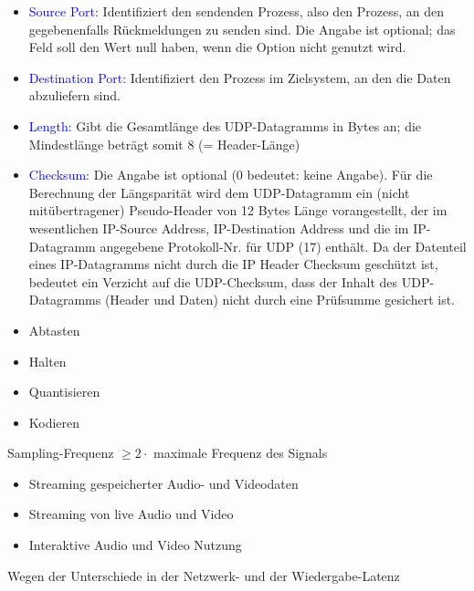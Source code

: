 \begin{itemize}
    \item \textcolor{blue}{Source Port:} Identifiziert den sendenden Prozess, also den Prozess, an den gegebenenfalls Rückmeldungen zu senden sind. Die Angabe ist optional; das Feld soll den Wert null haben, wenn die Option nicht genutzt wird.
    \item \textcolor{blue}{Destination Port:} Identifiziert den Prozess im Zielsystem, an den die Daten abzuliefern sind.
    \item \textcolor{blue}{Length:} Gibt die Gesamtlänge des UDP-Datagramms in Bytes an;
    die Mindestlänge beträgt somit 8 (= Header-Länge)
    \item \textcolor{blue}{Checksum:} Die Angabe ist optional (0 bedeutet: keine Angabe).
    Für die Berechnung der Längsparität wird dem UDP-Datagramm ein (nicht mitübertragener) Pseudo-Header von 12 Bytes Länge vorangestellt, der im wesentlichen IP-Source Address, IP-Destination Address und die im IP-Datagramm angegebene Protokoll-Nr. für UDP (17) enthält. Da der Datenteil eines IP-Datagramms nicht durch die IP Header Checksum geschützt ist, bedeutet ein Verzicht auf die UDP-Checksum, dass der Inhalt des UDP-Datagramms (Header und Daten) nicht durch eine Prüfsumme gesichert ist.
\end{itemize}

\begin{itemize}
    \item Abtasten
    \item Halten
    \item Quantisieren
    \item Kodieren
\end{itemize}

Sampling-Frequenz $\ge 2 \cdot$ maximale Frequenz des Signals

\begin{itemize}
    \item Streaming gespeicherter Audio- und Videodaten
    \item Streaming von live Audio und Video
    \item Interaktive Audio und Video Nutzung
\end{itemize}

Wegen der Unterschiede in der Netzwerk- und der Wiedergabe-Latenz

